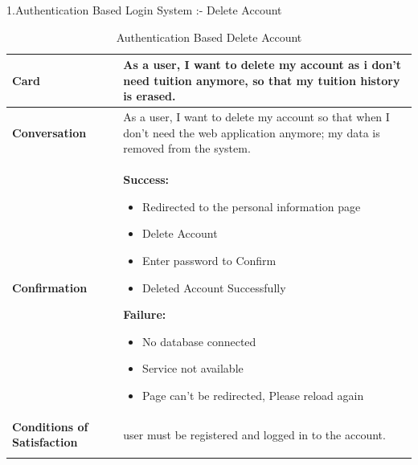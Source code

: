 1.Authentication Based Login System :- Delete Account
\begin{center}
\setlength{\tabcolsep}{0.8cm}
\renewcommand{\arraystretch}{1.2}
        \centering
        \begin{longtable}{|m{70pt}|p{9cm}|}
            \hline
                \textbf{Card} &
                    As a user, I want to delete my account as i don't need tuition anymore, so that my tuition history is erased.\\
            \hline
                \textbf{Conversation} &
                    As a user, I want to delete my account so that when I don't need the web application anymore; my data is removed from the system.\\
            \hline
                \textbf{Confirmation} &
                     \textbf{ Success:}
                        \begin{itemize}
                            \item Redirected to the personal information page
                            \item  Delete Account
                            \item  Enter password to Confirm
                            \item  Deleted Account Successfully
                        \end{itemize}  
                    \textbf{Failure:}
                        \begin{itemize}
                            \item  No database connected
                            \item    Service not available
                            \item   Page can't be redirected, Please reload again
                        \end{itemize} \\
            \hline
                \textbf{Conditions of Satisfaction} &  
                    user must be registered and logged in to the account.\\
            \hline
        \caption{Authentication Based Delete Account}
        \label{tab:my_label}
        \end{longtable}
\end{center}

